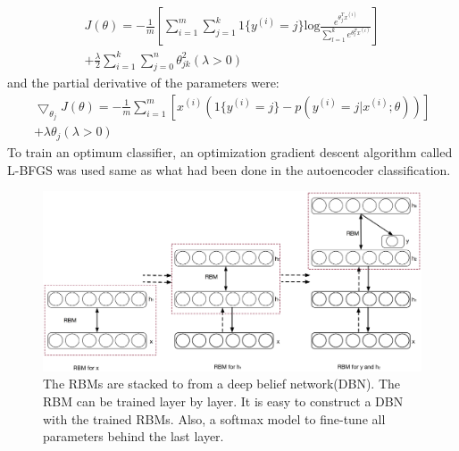 \documentclass[graybox]{svmult}
\begin{document}
\begin{equation}
\begin{split}
J(\theta) = -\frac{1}{m}[\sum_{i=1}^m\sum_{j=1}^k1\{y^{(i)}=j\}\text{log}{\frac{e^{\theta_j^Tx^{(i)}}}{\sum_{l=1}^ke^{\theta_l^Tx^{(i)}}}}] \\
+ \frac{\lambda}{2} \sum_{i=1}^k \sum_{j=0}^n \theta_{jk}^2 (\lambda>0)
\end{split}
\end{equation}
and the partial derivative of the parameters were:
\begin{equation}
\begin{split}
\bigtriangledown_{\theta_j}J(\theta) = -\frac{1}{m}\sum_{i=1}^m[x^{(i)}(1\{y^{(i)}=j\}-p(y^{(i)}=j|x^{(i)};\theta))] \\
+ \lambda\theta_j  (\lambda>0)
\end{split}
\end{equation}
To train an optimum classifier, an optimization gradient descent algorithm called L-BFGS was used same as what had been done in the autoencoder classification.

\begin{figure}[b]
\sidecaption
\includegraphics[scale=.3]{dbn}
%
%
\caption{The RBMs are stacked to from a deep belief network(DBN). The RBM can be trained layer by layer. It is easy to construct a DBN with the trained RBMs. Also, a softmax model to fine-tune all parameters behind the last layer.}
\label{fig:5}       %
\end{figure}
\end{document}
